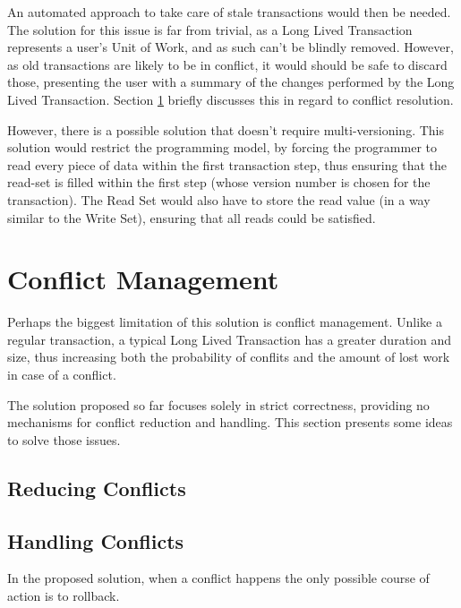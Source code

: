 An automated approach to take care of stale transactions would then be
needed. The solution for this issue is far from trivial, as a Long
Lived Transaction represents a user's Unit of Work, and as such can't
be blindly removed. However, as old transactions are likely to be in
conflict, it would should be safe to discard those, presenting the
user with a summary of the changes performed by the Long Lived
Transaction. Section \ref{sec:conflicts} briefly discusses this in
regard to conflict resolution.

However, there is a possible solution that doesn't require
multi-versioning. This solution would restrict the programming model,
by forcing the programmer to read every piece of data within the first
transaction step, thus ensuring that the read-set is filled within the
first step (whose version number is chosen for the transaction). The
Read Set would also have to store the read value (in a way similar to
the Write Set), ensuring that all reads could be satisfied.

\section{Conflict Management}
\label{sec:conflicts}

Perhaps the biggest limitation of this solution is conflict
management. Unlike a regular transaction, a typical Long Lived
Transaction has a greater duration and size, thus increasing both the
probability of conflits and the amount of lost work in case of a
conflict.

The solution proposed so far focuses solely in strict correctness,
providing no mechanisms for conflict reduction and handling. This
section presents some ideas to solve those issues.

\subsection{Reducing Conflicts}





\subsection{Handling Conflicts}

In the proposed solution, when a conflict happens the only possible
course of action is to rollback. 